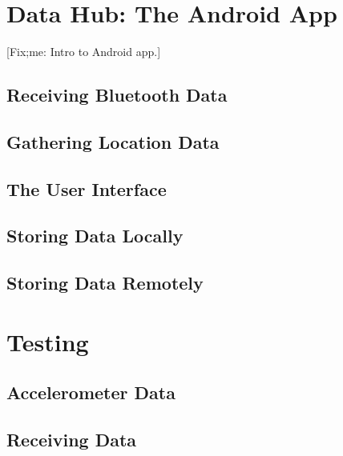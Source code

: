 \documentclass[11pt, a4paper, oneside, english]{scrbook}
\begin{document}
\chapter{Data Hub: The Android App} %
\label{cha:data_hub}
[Fix;me: Intro to Android app.]
\section{Receiving Bluetooth Data} %
\label{sec:receiving_bluetooth_data}

\section{Gathering Location Data} %
\label{sec:gathering_location_data}

\section{The User Interface} %
\label{sec:the_user_interface}

\section{Storing Data Locally} %
\label{sec:storing_data_locally}

\section{Storing Data Remotely} %
\label{sec:storing_data_remotely}

\chapter{Testing} %
\label{cha:testing}
\section{Accelerometer Data} %
\label{sec:accelerometer_data}

\section{Receiving Data} %
\label{sec:test_1_receiving_data}
\end{document}
